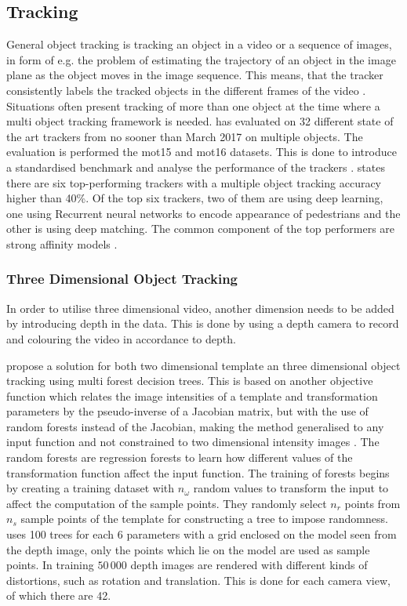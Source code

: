 \subsection{Tracking}
General object tracking is tracking an object in a video or a sequence of images, in form of e.g. the problem of estimating the trajectory of an object in the image plane as the object moves in the image sequence. This means, that the tracker consistently labels the tracked objects in the different frames of the video \citep{Yilmaz2006}. Situations often present tracking of more than one object at the time where a multi object tracking framework is needed. \cite{Leal-Taixe2017} has evaluated on 32 different state of the art trackers from no sooner than March 2017 on multiple objects. The evaluation is performed the \gls{mot}15 and \gls{mot}16 datasets. This is done to introduce a standardised benchmark and analyse the performance of the trackers \citep{Leal-Taixe2017}. \cite{Leal-Taixe2017} states there are six top-performing trackers with a multiple object tracking accuracy higher than 40\%. Of the top six trackers, two of them are using deep learning, one using Recurrent neural networks to encode appearance of pedestrians and the other is using deep matching. The common component of the top performers are strong affinity models \citep{Leal-Taixe2017}.

\subsubsection{Three Dimensional Object Tracking}
In order to utilise three dimensional video, another dimension needs to be added by introducing depth in the data. This is done by using a depth camera to record and colouring the video in accordance to depth.

\cite{Tan2014} propose a solution for both two dimensional template an three dimensional object tracking using multi forest decision trees. This is based on another objective function which relates the image intensities of a template and transformation parameters by the pseudo-inverse of a Jacobian matrix, but with the use of random forests instead of the Jacobian, making the method generalised to any input function and not constrained to two dimensional intensity images \citep{Tan2014}. The random forests are regression forests to learn how different values of the transformation function affect the input function. The training of forests begins by creating a training dataset with $n_\omega$ random values to transform the input to affect the computation of the sample points. They randomly select $n_r$ points from $n_s$ sample points of the template for constructing a tree to impose randomness. \cite{Tan2014} uses 100 trees for each 6 parameters with a grid enclosed on the model seen from the depth image, only the points which lie on the model are used as sample points. In training $50\,000$ depth images are rendered with different kinds of distortions, such as rotation and translation. This is done for each camera view, of which there are 42.

